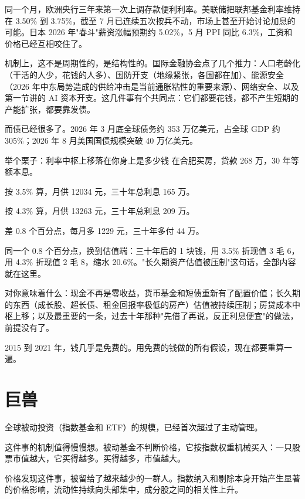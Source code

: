 同一个月，欧洲央行三年来第一次上调存款便利利率。美联储把联邦基金利率维持在 3.50\% 到 3.75\%，截至 7 月已连续五次按兵不动，市场上甚至开始讨论加息的可能。日本 2026 年"春斗"薪资涨幅预期约 5.02\%，5 月 PPI 同比 6.3\%，工资和价格已经互相咬住了。

机制上，这不是周期性的，是结构性的。国际金融协会点了几个推力：人口老龄化（干活的人少，花钱的人多）、国防开支（地缘紧张，各国都在加）、能源安全（2026 年中东局势造成的供给冲击是当前通胀粘性的重要来源）、网络安全、以及第一节讲的 AI 资本开支。这几件事有个共同点：它们都要花钱，都不产生短期的产能扩张，都要靠发债。

而债已经很多了。2026 年 3 月底全球债务约 353 万亿美元，占全球 GDP 约 305\%；2026 年 8 月美国国债规模突破 40 万亿美元。

\begin{egbox}{举个栗子：利率中枢上移落在你身上是多少钱}
在合肥买房，贷款 268 万，30 年等额本息。

按 3.5\% 算，月供 12034 元，三十年总利息 165 万。

按 4.3\% 算，月供 13263 元，三十年总利息 209 万。

差 0.8 个百分点，每月多 1229 元，三十年多付 44 万。

同一个 0.8 个百分点，换到估值端：三十年后的 1 块钱，用 3.5\% 折现值 3 毛 6，用 4.3\% 折现值 2 毛 8，缩水 20.6\%。"长久期资产估值被压制"这句话，全部内容就在这里。

\end{egbox}

对你意味着什么：现金不再是零收益，货币基金和短债重新有了配置价值；长久期的东西（成长股、超长债、租金回报率极低的房产）估值被持续压制；房贷成本中枢上移；以及最重要的一条，过去十年那种"先借了再说，反正利息便宜"的做法，前提没有了。

\begin{pullquote}{}
2015 到 2021 年，钱几乎是免费的。用免费的钱做的所有假设，现在都要重算一遍。
\end{pullquote}

\section{巨兽}

全球被动投资（指数基金和 ETF）的规模，已经首次超过了主动管理。

这件事的机制值得慢慢想。被动基金不判断价格，它按指数权重机械买入：一只股票市值越大，它买得越多。买得越多，市值越大。

价格发现这件事，被留给了越来越少的一群人。指数纳入和剔除本身开始产生显著的价格影响，流动性持续向头部集中，成分股之间的相关性上升。

